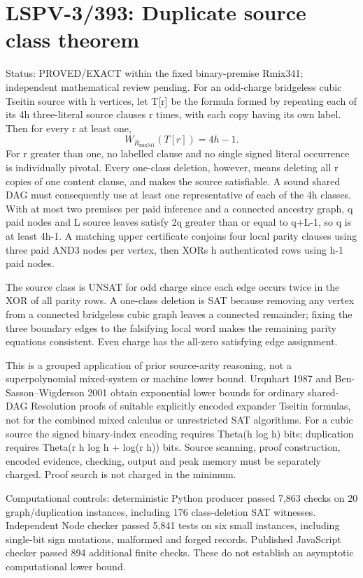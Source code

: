 \documentclass{article}
\begin{document}
\section*{LSPV-3/393: Duplicate source class theorem}
Status: PROVED/EXACT within the fixed binary-premise Rmix341; independent mathematical review pending.
For an odd-charge bridgeless cubic Tseitin source with h vertices, let T[r] be the formula formed by repeating each of its 4h three-literal source clauses r times, with each copy having its own label. Then for every r at least one,
\[
W_{R_{\mathrm{mix341}}}(T[r])=4h-1.
\]
For r greater than one, no labelled clause and no single signed literal occurrence is individually pivotal. Every one-class deletion, however, means deleting all r copies of one content clause, and makes the source satisfiable. A sound shared DAG must consequently use at least one representative of each of the 4h classes. With at most two premises per paid inference and a connected ancestry graph, q paid nodes and L source leaves satisfy 2q greater than or equal to q+L-1, so q is at least 4h-1. A matching upper certificate conjoins four local parity clauses using three paid AND3 nodes per vertex, then XORs h authenticated rows using h-1 paid nodes.

The source class is UNSAT for odd charge since each edge occurs twice in the XOR of all parity rows. A one-class deletion is SAT because removing any vertex from a connected bridgeless cubic graph leaves a connected remainder; fixing the three boundary edges to the falsifying local word makes the remaining parity equations consistent. Even charge has the all-zero satisfying edge assignment.

This is a grouped application of prior source-arity reasoning, not a superpolynomial mixed-system or machine lower bound. Urquhart 1987 and Ben-Sasson--Wigderson 2001 obtain exponential lower bounds for ordinary shared-DAG Resolution proofs of suitable explicitly encoded expander Tseitin formulas, not for the combined mixed calculus or unrestricted SAT algorithms. For a cubic source the signed binary-index encoding requires Theta(h log h) bits; duplication requires Theta(r h log h + log(r h)) bits. Source scanning, proof construction, encoded evidence, checking, output and peak memory must be separately charged. Proof search is not charged in the minimum.

Computational controls: deterministic Python producer passed 7,863 checks on 20 graph/duplication instances, including 176 class-deletion SAT witnesses. Independent Node checker passed 5,841 tests on six small instances, including single-bit sign mutations, malformed and forged records. Published JavaScript checker passed 894 additional finite checks. These do not establish an asymptotic computational lower bound.
\end{document}
